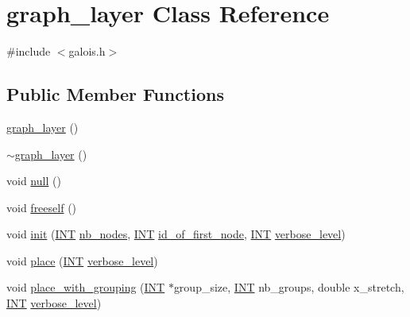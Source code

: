 \hypertarget{classgraph__layer}{}\section{graph\+\_\+layer Class Reference}
\label{classgraph__layer}


{\ttfamily \#include $<$galois.\+h$>$}

\subsection*{Public Member Functions}
\begin{DoxyCompactItemize}
\item 
\mbox{\hyperlink{classgraph__layer_a3b0f1d6cd9c014a467d51f7c7dad9a69}{graph\+\_\+layer}} ()
\item 
\mbox{\hyperlink{classgraph__layer_a046e1ac94b52119b3a17abec31d316d6}{$\sim$graph\+\_\+layer}} ()
\item 
void \mbox{\hyperlink{classgraph__layer_acf0da08ee035ec4e75d754b9169700f2}{null}} ()
\item 
void \mbox{\hyperlink{classgraph__layer_af6d280f56bdec46e2650648fd597a127}{freeself}} ()
\item 
void \mbox{\hyperlink{classgraph__layer_a4b3e02d2069fb0127514a3d9ce000ff0}{init}} (\mbox{\hyperlink{galois_8h_a09fddde158a3a20bd2dcadb609de11dc}{I\+NT}} \mbox{\hyperlink{classgraph__layer_aba70816fc271588e4393450b071460e0}{nb\+\_\+nodes}}, \mbox{\hyperlink{galois_8h_a09fddde158a3a20bd2dcadb609de11dc}{I\+NT}} \mbox{\hyperlink{classgraph__layer_a8fdef3e79a5c98d05bcafaed5b41e11b}{id\+\_\+of\+\_\+first\+\_\+node}}, \mbox{\hyperlink{galois_8h_a09fddde158a3a20bd2dcadb609de11dc}{I\+NT}} \mbox{\hyperlink{simeon_8_c_a818073fbcc2f439e7c56952f67386122}{verbose\+\_\+level}})
\item 
void \mbox{\hyperlink{classgraph__layer_a24ae195b3ddbb86164b816db1ad2223a}{place}} (\mbox{\hyperlink{galois_8h_a09fddde158a3a20bd2dcadb609de11dc}{I\+NT}} \mbox{\hyperlink{simeon_8_c_a818073fbcc2f439e7c56952f67386122}{verbose\+\_\+level}})
\item 
void \mbox{\hyperlink{classgraph__layer_a3a75deb6bc8d38d369004528b3d06f76}{place\+\_\+with\+\_\+grouping}} (\mbox{\hyperlink{galois_8h_a09fddde158a3a20bd2dcadb609de11dc}{I\+NT}} $\ast$group\+\_\+size, \mbox{\hyperlink{galois_8h_a09fddde158a3a20bd2dcadb609de11dc}{I\+NT}} nb\+\_\+groups, double x\+\_\+stretch, \mbox{\hyperlink{galois_8h_a09fddde158a3a20bd2dcadb609de11dc}{I\+NT}} \mbox{\hyperlink{simeon_8_c_a818073fbcc2f439e7c56952f67386122}{verbose\+\_\+level}})

\end{DoxyCompactItemize}
